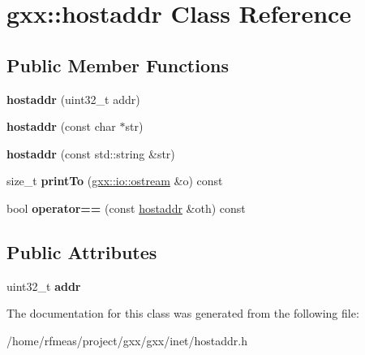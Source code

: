 \hypertarget{classgxx_1_1hostaddr}{}\section{gxx\+:\+:hostaddr Class Reference}
\label{classgxx_1_1hostaddr}
\subsection*{Public Member Functions}
\begin{DoxyCompactItemize}
\item 
{\bfseries hostaddr} (uint32\+\_\+t addr)\hypertarget{classgxx_1_1hostaddr_a559a6cc5ae741b8eeba956cc2747c90e}{}\label{classgxx_1_1hostaddr_a559a6cc5ae741b8eeba956cc2747c90e}

\item 
{\bfseries hostaddr} (const char $\ast$str)\hypertarget{classgxx_1_1hostaddr_a030ce77f90265a3223033394e5eccf3f}{}\label{classgxx_1_1hostaddr_a030ce77f90265a3223033394e5eccf3f}

\item 
{\bfseries hostaddr} (const std\+::string \&str)\hypertarget{classgxx_1_1hostaddr_a5d6451597fa64d3c7b89d5442bcc21f1}{}\label{classgxx_1_1hostaddr_a5d6451597fa64d3c7b89d5442bcc21f1}

\item 
size\+\_\+t {\bfseries print\+To} (\hyperlink{classgxx_1_1io_1_1ostream}{gxx\+::io\+::ostream} \&o) const \hypertarget{classgxx_1_1hostaddr_a3b64fd41ffdf5c657844c75f8a1bb509}{}\label{classgxx_1_1hostaddr_a3b64fd41ffdf5c657844c75f8a1bb509}

\item 
bool {\bfseries operator==} (const \hyperlink{classgxx_1_1hostaddr}{hostaddr} \&oth) const \hypertarget{classgxx_1_1hostaddr_a127b05053f5e3198b6d565e3ae050dc0}{}\label{classgxx_1_1hostaddr_a127b05053f5e3198b6d565e3ae050dc0}

\end{DoxyCompactItemize}
\subsection*{Public Attributes}
\begin{DoxyCompactItemize}
\item 
uint32\+\_\+t {\bfseries addr}\hypertarget{classgxx_1_1hostaddr_a22681fae8d55f3a5d1aa9dbfc2192b2a}{}\label{classgxx_1_1hostaddr_a22681fae8d55f3a5d1aa9dbfc2192b2a}

\end{DoxyCompactItemize}


The documentation for this class was generated from the following file\+:\begin{DoxyCompactItemize}
\item 
/home/rfmeas/project/gxx/gxx/inet/hostaddr.\+h\end{DoxyCompactItemize}
